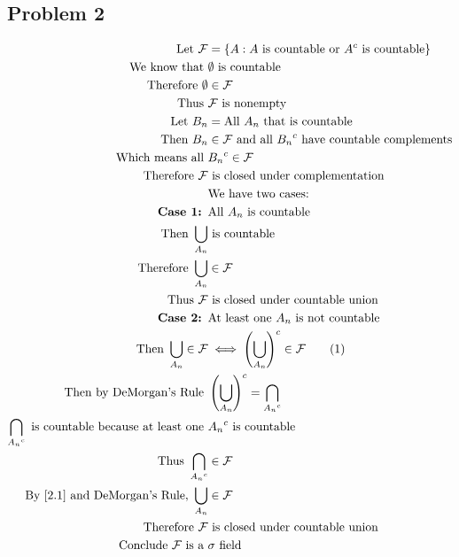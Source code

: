 \documentclass{article}
\begin{document}
\begin{flushleft}
\section*{Problem 2}
\begin{align*}
\text{Let } \mathcal{F}&=\left\{A:A \text{ is countable or }A^c \text{ is countable}\right\}\\
\text{We know that } &\emptyset \text{ is countable}\\
\text{Therefore } \emptyset &\in \mathcal{F}\\
\text{Thus } &\mathcal{F} \text{ is nonempty}\\
\text{Let } B_n&=\text{All } A_n \text{ that is countable}\\
\text{Then } B_n &\in \mathcal{F} \text{ and all } {B_n}^c \text{ have countable complements}\\
\text{Which means all }& {B_n}^c \in \mathcal{F}\\
\text{Therefore } \mathcal{F}& \text{ is closed under complementation}\\
&\text{We have two cases:}\\
\textbf{Case 1: }& \text{All } A_n \text{ is countable}\\
\text{Then } \bigcup_{A_n}& \text{ is countable}\\
\text{Therefore } \bigcup_{A_n} &\in \mathcal{F}\\
\text{Thus } \mathcal{F} &\text{ is closed under countable union}\\
\textbf{Case 2: }& \text{At least one } A_n \text{ is not countable}\\
\text{Then }\bigcup_{A_n} \in \mathcal{F} & \iff \left(\bigcup_{A_n}\right)^c \in \mathcal{F} \label{2.1} \tag{1}\\
\text{Then by DeMorgan's Rule }& \left(\bigcup_{A_n}\right)^c = \bigcap_{{A_n}^c}\\
\bigcap_{{A_n}^c} \text{ is countable because at least one }& {A_n}^c \text{ is countable}\\
\text{Thus } \bigcap_{{A_n}^c} &\in \mathcal{F}\\
\text{By } \eqref{2.1} \text{ and DeMorgan's Rule}, \ \bigcup_{A_n} &\in \mathcal{F}\\
\text{Therefore } \mathcal{F} &\text{ is closed under countable union}\\
\text{Conclude } \mathcal{F} \text{ is a }& \sigma \text{ field}
\end{align*}

\end{flushleft}
\end{document}
